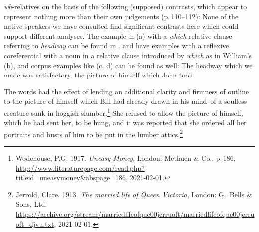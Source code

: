 \documentclass[output=paper,biblatex,babelshorthands,newtxmath,draftmode,colorlinks,citecolor=brown]{langscibook}
\begin{document}
\emph{wh}-relatives on the basis of the following (supposed) contrasts, which appear to represent
nothing more than their own judgements (p.\,110--112):
\eal
{}
\label{ex:min-headway-that}
\label{ex:min-headway-which}
\zl
\eal
{}
\label{ex:min-admire-that}
\label{ex:min-admire-which} 
\zl
\eal
{}
\label{ex:min-picture-that}
\label{ex:min-picture-which} 
\zl
%
\largerpage
None of the native speakers we have consulted find significant contrasts here which could support
different analyses. The example in (a) with a \emph{which} relative clause referring to \emph{headway} can be found in
.  and  have examples
with a reflexive coreferential with a noun in a relative clause introduced by \emph{which} as in
William's (b), and corpus examples like (c, d) can be found as well:
\ealnoraggedright
\ex The headway which we made was satisfactory.
\ex the picture of himself which John took

\ex The words had the effect of lending an additional clarity and firmness of outline to the picture
    of himself which Bill had already drawn in his mind--of a soulless creature sunk in hoggish
    slumber.\footnote{
      Wodehouse, P.G. 1917. \emph{Uneasy Money}, London: Methuen \& Co., p.\,186,\\
      \url{http://www.literaturepage.com/read.php?titleid=uneasymoney&abspage=186},
      2021-02-01.
}
\ex She refused to allow the 
picture of himself, which he had sent her, to be hung, 
and it was reported that she ordered all her portraits 
and busts of him to be put in the lumber attics.\footnote{
 Jerrold, Clare. 1913. \emph{The married life of Queen Victoria}, London: G.\ Bells \& Sons, Ltd.\\
 \url{https://archive.org/stream/marriedlifeofque00jerruoft/marriedlifeofque00jerruoft_djvu.txt}, 2021-02-01.
}
\end{document}

